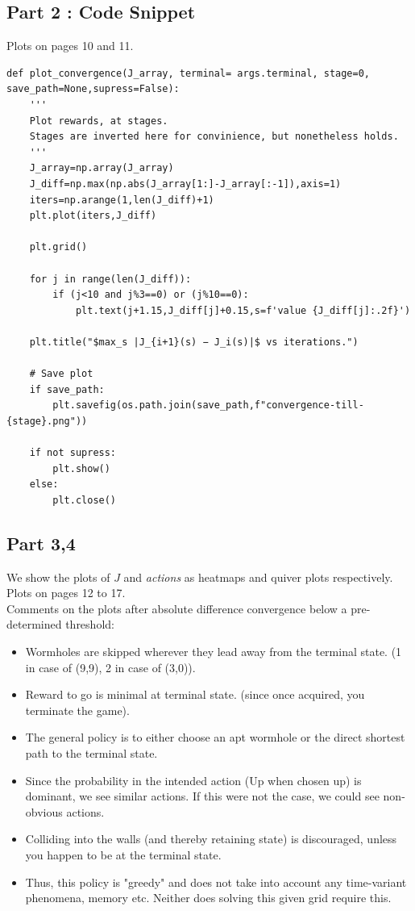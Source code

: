 \subsection{Part 2 : Code Snippet}

Plots on pages 10 and 11.

\begin{lstlisting}
def plot_convergence(J_array, terminal= args.terminal, stage=0, save_path=None,supress=False):
    '''
    Plot rewards, at stages. 
    Stages are inverted here for convinience, but nonetheless holds.
    '''
    J_array=np.array(J_array)
    J_diff=np.max(np.abs(J_array[1:]-J_array[:-1]),axis=1)
    iters=np.arange(1,len(J_diff)+1)
    plt.plot(iters,J_diff)
 
    plt.grid()

    for j in range(len(J_diff)):
        if (j<10 and j%3==0) or (j%10==0):
            plt.text(j+1.15,J_diff[j]+0.15,s=f'value {J_diff[j]:.2f}')

    plt.title("$max_s |J_{i+1}(s) − J_i(s)|$ vs iterations.")

    # Save plot
    if save_path:
        plt.savefig(os.path.join(save_path,f"convergence-till-{stage}.png"))

    if not supress:
        plt.show()
    else:
        plt.close()
\end{lstlisting}

\subsection{Part 3,4}

We show the plots of $J$ and \textit{actions} as heatmaps and quiver plots respectively. \\

Plots on pages 12 to 17. \\

Comments on the plots after absolute difference convergence below a pre-determined threshold:
\begin{itemize}
\item  Wormholes are skipped wherever they lead away from the terminal state. (1 in case of (9,9), 2 in case of (3,0)).
\item  Reward to go is minimal at terminal state. (since once acquired, you terminate the game).
\item  The general policy is to either choose an apt wormhole or the direct shortest path to the terminal state.
\item  Since the probability in the intended action (Up when chosen up) is dominant, we see similar actions. If this were not the case, we could see non-obvious actions.
\item Colliding into the walls (and thereby retaining state) is discouraged, unless you happen to be at the terminal state.
\item Thus, this policy is "greedy" and does not take into account any time-variant phenomena, memory etc. Neither does solving this given grid require this.
\end{itemize}

